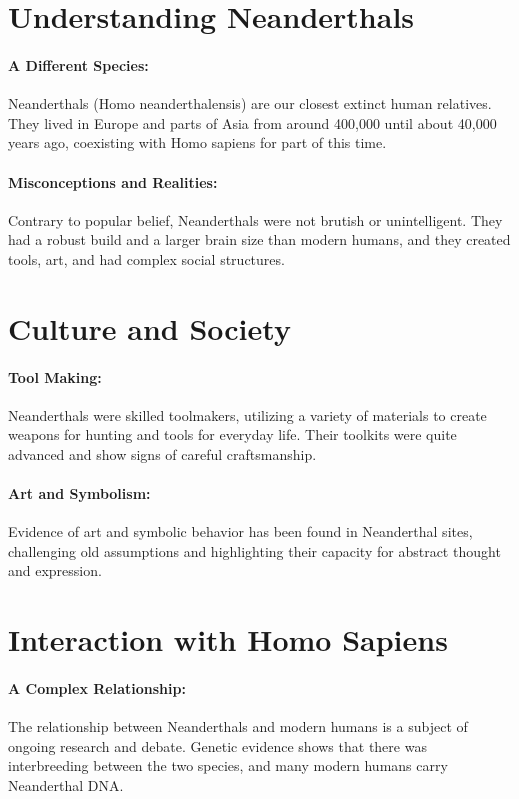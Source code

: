 \documentclass[a4paper,12pt]{book}
\begin{document}
\section*{Understanding Neanderthals}

\paragraph{A Different Species:}
Neanderthals (Homo neanderthalensis) are our closest extinct human relatives. They lived in Europe and parts of Asia from around 400,000 until about 40,000 years ago, coexisting with Homo sapiens for part of this time.

\paragraph{Misconceptions and Realities:}
Contrary to popular belief, Neanderthals were not brutish or unintelligent. They had a robust build and a larger brain size than modern humans, and they created tools, art, and had complex social structures.

\section*{Culture and Society}

\paragraph{Tool Making:}
Neanderthals were skilled toolmakers, utilizing a variety of materials to create weapons for hunting and tools for everyday life. Their toolkits were quite advanced and show signs of careful craftsmanship.

\paragraph{Art and Symbolism:}
Evidence of art and symbolic behavior has been found in Neanderthal sites, challenging old assumptions and highlighting their capacity for abstract thought and expression.

\section*{Interaction with Homo Sapiens}

\paragraph{A Complex Relationship:}
The relationship between Neanderthals and modern humans is a subject of ongoing research and debate. Genetic evidence shows that there was interbreeding between the two species, and many modern humans carry Neanderthal DNA.
\end{document}
